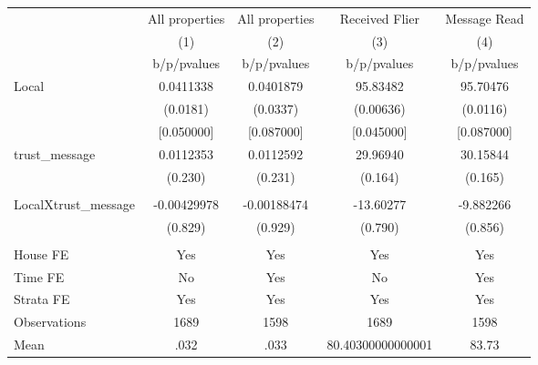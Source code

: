 {
\def\sym#1{\ifmmode^{#1}\else\(^{#1}\)\fi}
\begin{tabular}{l*{4}{c}}
\hline\hline
                &\multicolumn{1}{c}{All properties}&\multicolumn{1}{c}{All properties}&\multicolumn{1}{c}{Received Flier}&\multicolumn{1}{c}{Message Read}\\
                &\multicolumn{1}{c}{(1)}&\multicolumn{1}{c}{(2)}&\multicolumn{1}{c}{(3)}&\multicolumn{1}{c}{(4)}\\
                &b/p/pvalues&b/p/pvalues&b/p/pvalues&b/p/pvalues\\
\hline
Local           &0.0411338&0.0401879& 95.83482& 95.70476\\
                & (0.0181)& (0.0337)&(0.00636)& (0.0116)\\
                &[0.050000]&[0.087000]&[0.045000]&[0.087000]\\
trust\_message   &0.0112353&0.0112592& 29.96940& 30.15844\\
                &  (0.230)&  (0.231)&  (0.164)&  (0.165)\\
                &         &         &         &         \\
LocalXtrust\_message&-0.00429978&-0.00188474&-13.60277&-9.882266\\
                &  (0.829)&  (0.929)&  (0.790)&  (0.856)\\
                &         &         &         &         \\
House FE        &      Yes&      Yes&      Yes&      Yes\\
Time FE         &       No&      Yes&       No&      Yes\\
Strata FE       &      Yes&      Yes&      Yes&      Yes\\
\hline
Observations    &     1689&     1598&     1689&     1598\\
Mean            &     .032&     .033&80.40300000000001&    83.73\\
\hline\hline
\end{tabular}
}

